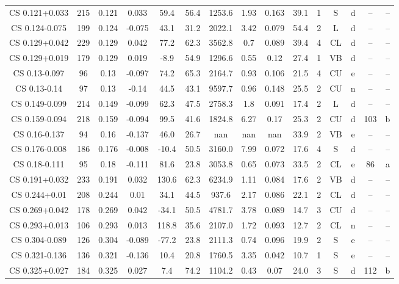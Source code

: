 \begin{table}
\begin{tabular}{ccccccccccccccc}
CS 0.121+0.033 & 215 & 0.121 & 0.033 & 59.4 & 56.4 & 1253.6 & 1.93 & 0.163 & 39.1 & 1 & S & d & -- & -- \\
CS 0.124-0.075 & 199 & 0.124 & -0.075 & 43.1 & 31.2 & 2022.1 & 3.42 & 0.079 & 54.4 & 2 & L & d & -- & -- \\
CS 0.129+0.042 & 229 & 0.129 & 0.042 & 77.2 & 62.3 & 3562.8 & 0.7 & 0.089 & 39.4 & 4 & CL & d & -- & -- \\
CS 0.129+0.019 & 179 & 0.129 & 0.019 & -8.9 & 54.9 & 1296.6 & 0.55 & 0.12 & 27.4 & 1 & VB & d & -- & -- \\
CS 0.13-0.097 & 96 & 0.13 & -0.097 & 74.2 & 65.3 & 2164.7 & 0.93 & 0.106 & 21.5 & 4 & CU & e & -- & -- \\
CS 0.13-0.14 & 97 & 0.13 & -0.14 & 44.5 & 43.1 & 9597.7 & 0.96 & 0.148 & 25.5 & 2 & CU & n & -- & -- \\
CS 0.149-0.099 & 214 & 0.149 & -0.099 & 62.3 & 47.5 & 2758.3 & 1.8 & 0.091 & 17.4 & 2 & L & d & -- & -- \\
CS 0.159-0.094 & 218 & 0.159 & -0.094 & 99.5 & 41.6 & 1824.8 & 6.27 & 0.17 & 25.3 & 2 & CU & d & 103 & b \\
CS 0.16-0.137 & 94 & 0.16 & -0.137 & 46.0 & 26.7 & nan & nan & nan & 33.9 & 2 & VB & e & -- & -- \\
CS 0.176-0.008 & 186 & 0.176 & -0.008 & -10.4 & 50.5 & 3160.0 & 7.99 & 0.072 & 17.6 & 4 & S & d & -- & -- \\
CS 0.18-0.111 & 95 & 0.18 & -0.111 & 81.6 & 23.8 & 3053.8 & 0.65 & 0.073 & 33.5 & 2 & CL & e & 86 & a \\
CS 0.191+0.032 & 233 & 0.191 & 0.032 & 130.6 & 62.3 & 6234.9 & 1.11 & 0.084 & 17.6 & 2 & VB & d & -- & -- \\
CS 0.244+0.01 & 208 & 0.244 & 0.01 & 34.1 & 44.5 & 937.6 & 2.17 & 0.086 & 22.1 & 2 & CL & d & -- & -- \\
CS 0.269+0.042 & 178 & 0.269 & 0.042 & -34.1 & 50.5 & 4781.7 & 3.78 & 0.089 & 14.7 & 3 & CU & d & -- & -- \\
CS 0.293+0.013 & 106 & 0.293 & 0.013 & 118.8 & 35.6 & 2107.0 & 1.72 & 0.093 & 12.7 & 2 & CL & n & -- & -- \\
CS 0.304-0.089 & 126 & 0.304 & -0.089 & -77.2 & 23.8 & 2111.3 & 0.74 & 0.096 & 19.9 & 2 & S & e & -- & -- \\
CS 0.321-0.136 & 136 & 0.321 & -0.136 & 10.4 & 20.8 & 1760.5 & 3.35 & 0.042 & 10.7 & 1 & S & e & -- & -- \\
CS 0.325+0.027 & 184 & 0.325 & 0.027 & 7.4 & 74.2 & 1104.2 & 0.43 & 0.07 & 24.0 & 3 & S & d & 112 & b \\

\end{tabular}
\end{table}

